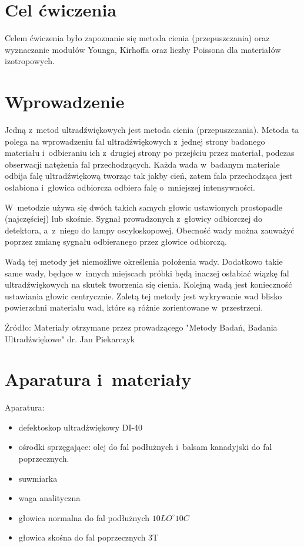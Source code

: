 \documentclass[a4paper,12pt]{article}
\begin{document}
    



\section{Cel ćwiczenia}

Celem ćwiczenia było zapoznanie się  metoda cienia (przepuszczania) oraz wyznaczanie modułów Younga, Kirhoffa oraz liczby Poissona dla materiałów izotropowych.

\section{Wprowadzenie}

Jedną z~metod ultradźwiękowych jest metoda cienia (przepuszczania). Metoda ta polega na wprowadzeniu fal ultradźwiękowych z~jednej strony badanego materiału i~odbieraniu ich z~drugiej strony po przejściu przez materiał, podczas obserwacji natężenia fal przechodzących. Każda wada w~badanym materiale odbija falę ultradźwiękową tworząc tak jakby cień, zatem fala przechodząca jest osłabiona i~głowica odbiorcza odbiera falę o~mniejszej intensywności.

W~metodzie używa się dwóch takich samych głowic ustawionych prostopadle (najczęściej) lub skośnie. Sygnał prowadzonych z~głowicy odbiorczej do detektora, a~z~niego do lampy oscyloskopowej. Obecność wady można zauważyć poprzez zmianę sygnału odbieranego przez głowice odbiorczą.

Wadą tej metody jet niemożliwe określenia położenia wady. Dodatkowo takie same wady, będące w~innych miejscach próbki będą inaczej osłabiać wiązkę fal ultradźwiękowych na skutek tworzenia się cienia. Kolejną wadą jest konieczność ustawiania głowic centrycznie. Zaletą tej metody jest wykrywanie wad blisko powierzchni materiału wad, które są różnie zorientowane w~przestrzeni.
\newline

Źródło: Materiały otrzymane przez prowadzącego "Metody Badań, Badania Ultradźwiękowe" dr. Jan Piekarczyk

\section{Aparatura i~materiały}

Aparatura:

\begin{itemize}
    \item defektoskop ultradźwiękowy  DI-40
    \item ośrodki sprzęgające: olej do fal podłużnych i~balsam kanadyjski do fal poprzecznych.
    \item suwmiarka
    \item waga analityczna
    \item głowica normalna do fal podłużnych $10LO^\circ10C$
    \item głowica skośna do fal poprzecznych 3T
\end{itemize} 
 
\end{document}
